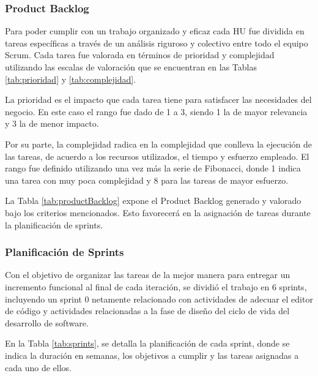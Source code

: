 

\subsubsection{Product Backlog}
Para poder cumplir con un trabajo organizado y eficaz cada HU fue dividida en tareas específicas a través de un análisis riguroso y colectivo entre todo el equipo Scrum. Cada tarea fue valorada en términos de prioridad y complejidad utilizando las escalas de valoración que se encuentran en las Tablas \ref{tab:prioridad} y \ref{tab:complejidad}.

La prioridad es el impacto que cada tarea tiene para satisfacer las necesidades del negocio. En este caso el rango fue dado de 1 a 3, siendo 1 la de mayor relevancia y 3 la de menor impacto.



Por su parte, la complejidad radica en la complejidad que conlleva la ejecución de las tareas, de acuerdo a los recursos utilizados, el tiempo y esfuerzo empleado. El rango fue definido utilizando una vez más la serie de Fibonacci, donde 1 indica una tarea con muy poca complejidad y 8 para las tareas de mayor esfuerzo.



La Tabla \ref{tab:productBacklog} expone el Product Backlog generado y valorado bajo los criterios mencionados. Esto favorecerá en la asignación de tareas durante la planificación de sprints.  



\subsubsection{Planificación de Sprints}
Con el objetivo de organizar las tareas de la mejor manera para entregar un incremento funcional al final de cada iteración, se dividió el trabajo en 6 sprints, incluyendo un sprint 0 netamente relacionado con actividades de adecuar el editor de código y actividades relacionadas a la fase de diseño del ciclo de vida del desarrollo de software.

En la Tabla \ref{tab:sprints}, se detalla la planificación de cada sprint, donde se indica la duración en semanas, los objetivos a cumplir y las tareas asignadas a cada uno de ellos.




